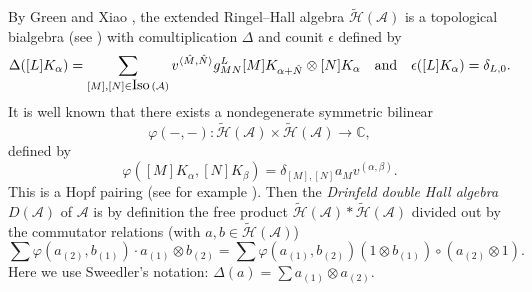 \documentclass[reqno,12pt]{amsart}
\numberwithin{equation}{section}
\def\lr#1{\langle #1\rangle} \def\fin{\hfill$\square$}  \def\lra{\longrightarrow} \def\Tor{\mbox{\rm Tor}\,}
\def\A{{\mathcal A}}\def\P{{\mathscr{P}}}
\theoremstyle{plain} %
\theoremstyle{definition} %
\begin{document}
By Green \cite{Gr95} and Xiao \cite{Xiao}, the extended Ringel--Hall algebra $\tilde{\mathcal {H}}(\A)$
is a topological bialgebra (see \cite{Sc}) with comultiplication $\Delta$ and counit $\epsilon$ defined by
$$\Delta([L]K_{\alpha})=\sum\limits_{[M],[N] \in \Iso(\mathcal{A})}v^{\lr{\hat{M},\hat{N}}}g_{MN}^L[M]K_{\alpha+\hat{N}}\otimes [N]K_{\alpha}\quad\mbox{and}\quad \epsilon([L]K_{\alpha})=\delta_{L,0}.$$
It is well known that there exists a nondegenerate symmetric bilinear
$$\varphi(-,-): \tilde{\mathcal {H}}(\A)\times\tilde{\mathcal {H}}(\A)\longrightarrow
\mathbb{C},$$ defined by
$$\varphi([M]K_{\alpha},[N]K_{\beta})=\delta_{[M],[N]}a_{M}v^{(\alpha,\beta)}.$$ This is a Hopf pairing (see for example \cite{Gr95,Sc,Xiao}).
Then the {\em Drinfeld double Hall algebra} $D(\A)$ of $\A$ is by definition the free product $\tilde{\mathcal {H}}(\A)\ast\tilde{\mathcal {H}}(\A)$ divided out by the commutator relations
(with $a,b\in\tilde{\mathcal {H}}(\A)$) \begin{equation}\label{Drinfeld}\sum\varphi(a_{(2)},b_{(1)})\cdot a_{(1)}\otimes b_{(2)}=\sum\varphi(a_{(1)},b_{(2)})(1\otimes b_{(1)})\circ (a_{(2)}\otimes1).\end{equation} Here we use Sweedler's notation: $\Delta(a)=\sum a_{(1)}\otimes a_{(2)}$.

%
%
%
\end{document}
